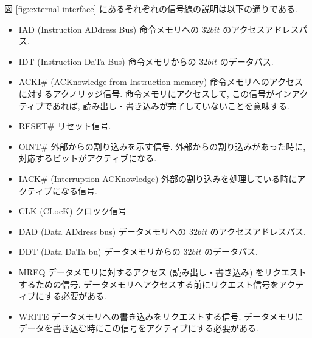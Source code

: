 \documentclass[../specifications.tex]{subfiles}
\begin{document}
  図 \ref{fig:external-interface} にあるそれぞれの信号線の説明は以下の通りである.
  \begin{itemize}
    \item IAD (Instruction ADdress Bus)
    \newline 命令メモリへの $32bit$ のアクセスアドレスパス.

    \item IDT (Instruction DaTa Bus)
    \newline 命令メモリからの $32bit$ のデータパス.

    \item ACKI\# (ACKnowledge from Instruction memory)
    \newline 命令メモリへのアクセスに対するアクノリッジ信号.
    命令メモリにアクセスして, この信号がインアクティブであれば, 
    読み出し・書き込みが完了していないことを意味する.
    
    \item RESET\#
    \newline リセット信号.

    \item OINT\#
    \newline 外部からの割り込みを示す信号.
    外部からの割り込みがあった時に, 対応するビットがアクティブになる.

    \item IACK\# (Interruption ACKnowledge)
    \newline 外部の割り込みを処理している時にアクティブになる信号.

    \item CLK (CLocK)
    \newline クロック信号

    \item DAD (Data ADdress bus)
    \newline データメモリへの $32bit$ のアクセスアドレスパス.

    \item DDT (Data DaTa bu)
    \newline データメモリからの $32bit$ のデータパス.

    \item MREQ
    \newline データメモリに対するアクセス (読み出し・書き込み) をリクエストするための信号.
    データメモリへアクセスする前にリクエスト信号をアクティブにする必要がある.

    \item WRITE
    \newline データメモリへの書き込みをリクエストする信号.
    データメモリにデータを書き込む時にこの信号をアクティブにする必要がある.


\end{itemize}
\end{document}
